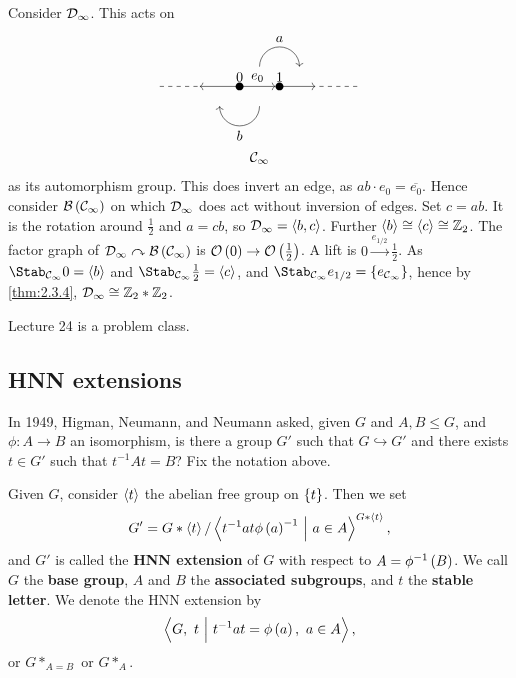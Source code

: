 \begin{example}
Consider $ \mathcal{D}_\infty $. This acts on
$$
\begin{array}{c}
\begin{tikzpicture}
\fill (0, 0) circle (0.1) node[above]{$ 0 $};
\fill (1, 0) circle (0.1) node[above]{$ 1 $};
\draw [dashed] (-2, 0) to (-1, 0);
\draw [->] (0, 0) to (-1, 0);
\draw [->] (0, 0) to node[above]{$ e_0 $} (0.9, 0);
\draw [->] (1, 0) to (1.9, 0);
\draw [dashed] (2, 0) to (3, 0);
\draw [->] (0.5, 0.5) arc (180:0:0.5);
\draw [->] (0.5, -0.5) arc (0:-180:0.5);
\fill (1, 1) node[above]{$ a $};
\fill (0, -1) node[below]{$ b $};
\end{tikzpicture}
\\
\CCC_\infty
\end{array}
$$
as its automorphism group. This does invert an edge, as $ ab \cdot e_0 = \overline{e_0} $. Hence consider $ \BBB\br{\CCC_\infty} $ on which $ \mathcal{D}_\infty $ does act without inversion of edges. Set $ c = ab $. It is the rotation around $ \tfrac{1}{2} $ and $ a = cb $, so $ \mathcal{D}_\infty = \left\langle b, c \right\rangle $. Further $ \left\langle b \right\rangle \cong \left\langle c \right\rangle \cong \mathbb{Z}_2 $. The factor graph of $ \DDD_\infty \curvearrowright \BBB\br{\CCC_\infty} $ is $ \OOO\br{0} \to \OOO\br{\tfrac{1}{2}} $. A lift is $ 0 \xrightarrow{e_{1 / 2}} \tfrac{1}{2} $. As $ \Stab_{\CCC_\infty} 0 = \abr{b} $ and $ \Stab_{\CCC_\infty} \tfrac{1}{2} = \abr{c} $, and $ \Stab_{\CCC_\infty} e_{1 / 2} = \cbr{e_{\CCC_\infty}} $, hence by \ref{thm:2.3.4}, $ \mathcal{D}_\infty \cong \mathbb{Z}_2 * \mathbb{Z}_2 $.
\end{example}


Lecture 24 is a problem class.

\pagebreak

\subsection{HNN extensions}


In 1949, Higman, Neumann, and Neumann asked, given $ G $ and $ A, B \le G $, and $ \phi : A \to B $ an isomorphism, is there a group $ G' $ such that $ G \hookrightarrow G' $ and there exists $ t \in G' $ such that $ t^{-1}At = B $? Fix the notation above.

\begin{definition}
Given $ G $, consider $ \left\langle t \right\rangle $ the abelian free group on $ \cbr{t} $. Then we set
$$ G' = G * \abr{t} / \abr{t^{-1}at\phi\br{a}^{-1} \st a \in A}^{G * \abr{t}}, $$
and $ G' $ is called the \textbf{HNN extension} of $ G $ with respect to $ A = \phi^{-1}\br{B} $. We call $ G $ the \textbf{base group}, $ A $ and $ B $ the \textbf{associated subgroups}, and $ t $ the \textbf{stable letter}. We denote the HNN extension by
$$ \abr{G, \ t \st t^{-1}at = \phi\br{a}, \ a \in A}, $$
or $ G *_{A = B} $ or $ G *_A $.
\end{definition}

